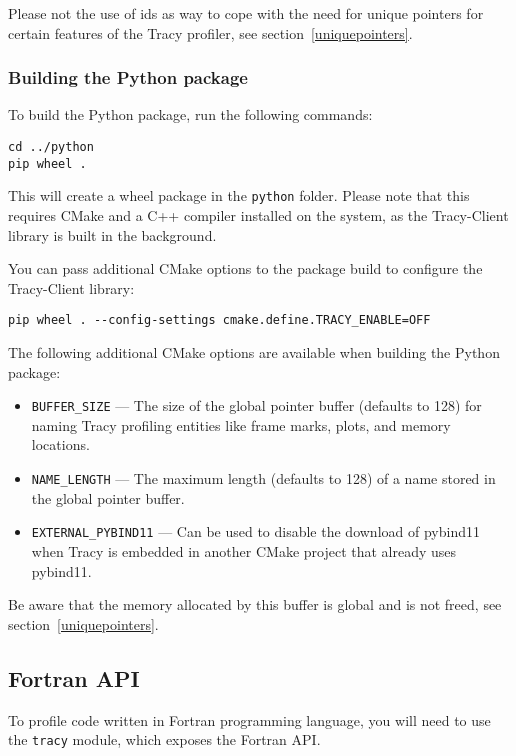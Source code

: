\documentclass[hidelinks,titlepage,a4paper,twoside]{article}
\begin{document}
Please not the use of ids as way to cope with the need for unique pointers for certain features of the Tracy profiler, see section~\ref{uniquepointers}.

\subsubsection{Building the Python package}

To build the Python package, run the following commands:

\begin{lstlisting}
cd ../python
pip wheel .
\end{lstlisting}

This will create a wheel package in the \texttt{python} folder.
Please note that this requires CMake and a C++ compiler installed on the system, as the Tracy-Client library is built in the background.

You can pass additional CMake options to the package build to configure the Tracy-Client library:
\begin{lstlisting}
pip wheel . --config-settings cmake.define.TRACY_ENABLE=OFF
\end{lstlisting}

The following additional CMake options are available when building the Python package:

\begin{itemize}
\item \texttt{BUFFER\_SIZE} --- The size of the global pointer buffer (defaults to 128) for naming Tracy profiling entities like frame marks, plots, and memory locations.
\item \texttt{NAME\_LENGTH} --- The maximum length (defaults to 128) of a name stored in the global pointer buffer.
\item \texttt{EXTERNAL\_PYBIND11} --- Can be used to disable the download of pybind11 when Tracy is embedded in another CMake project that already uses pybind11.
\end{itemize}

Be aware that the memory allocated by this buffer is global and is not freed, see section~\ref{uniquepointers}.

\subsection{Fortran API}
\label{fortranapi}

To profile code written in Fortran programming language, you will need to use the \texttt{tracy} module, which exposes the Fortran API.
\end{document}
